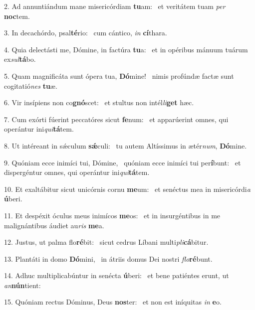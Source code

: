 2. Ad annuntiándum mane misericórdiam \textbf{tu}am: \ast\  et veritátem tuam \textit{per} \textbf{noc}tem.\

3. In decachórdo, psal\textbf{té}rio: \ast\  cum cántico, \textit{in} \textbf{cí}thara.\

4. Quia delectásti me, Dómine, in factúra \textbf{tu}a: \ast\  et in opéribus mánuum tuárum ex\textit{sul}\textbf{tá}bo.\

5. Quam magnificáta sunt ópera tua, \textbf{Dó}mine! \ast\  nimis profúndæ factæ sunt cogitatió\textit{nes} \textbf{tu}æ.\

6. Vir insípiens non co\textbf{gnó}scet: \ast\  et stultus non intél\textit{li}\textbf{get} hæc.\

7. Cum exórti fúerint peccatóres sicut \textbf{fe}num: \ast\  et apparúerint omnes, qui operántur ini\textit{qui}\textbf{tá}tem.\

8. Ut intéreant in sǽculum \textbf{sǽ}culi: \ast\  tu autem Altíssimus in ætér\textit{num}, \textbf{Dó}mine.\

9. Quóniam ecce inimíci tui, Dómine, \dag\  quóniam ecce inimíci tui per\textbf{í}bunt: \ast\  et dispergéntur omnes, qui operántur ini\textit{qui}\textbf{tá}tem.\

10. Et exaltábitur sicut unicórnis cornu \textbf{me}um: \ast\  et senéctus mea in misericórdi\textit{a} \textbf{ú}beri.\

11. Et despéxit óculus meus inimícos \textbf{me}os: \ast\  et in insurgéntibus in me malignántibus áudiet au\textit{ris} \textbf{me}a.\

12. Justus, ut palma flo\textbf{ré}bit: \ast\  sicut cedrus Líbani multi\textit{pli}\textbf{cá}bitur.\

13. Plantáti in domo \textbf{Dó}mini, \ast\  in átriis domus Dei nostri \textit{flo}\textbf{ré}bunt.\

14. Adhuc multiplicabúntur in senécta \textbf{ú}beri: \ast\  et bene patiéntes erunt, ut \textit{an}\textbf{nún}tient:\

15. Quóniam rectus Dóminus, Deus \textbf{nos}ter: \ast\  et non est iníquitas \textit{in} \textbf{e}o.\

